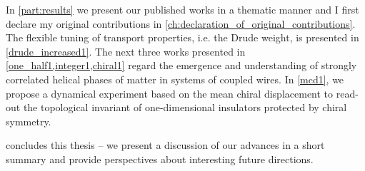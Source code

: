 In \cref{part:results} we present our published works in a thematic manner and I first declare my original contributions in \cref{ch:declaration_of_original_contributions}.
The flexible tuning of transport properties, i.e. the Drude weight, is presented in \cref{drude_increased1}.
The next three works presented in \cref{one_half1,integer1,chiral1} regard the emergence and understanding of strongly correlated helical phases of matter in systems of coupled wires.
In \cref{mcd1}, we propose a dynamical experiment based on the mean chiral displacement to read-out the topological invariant of one-dimensional insulators protected by chiral symmetry.

 concludes this thesis -- we present a discussion of our advances in a short summary and provide perspectives about interesting future directions.
